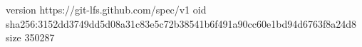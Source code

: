 version https://git-lfs.github.com/spec/v1
oid sha256:3152dd3749dd5d08a31c83e5c72b38541b6f491a90cc60e1bd94d6763f8a24d8
size 350287
